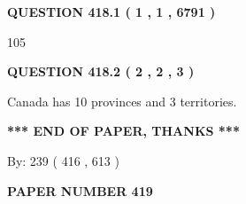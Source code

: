 \documentclass[12pt]{article}
\begin{document}
   
   
   
 \vspace{0.2in}
 
 
 
 
   
   
  
\vspace{0.2in}
  
{\textbf{\Large{QUESTION
418.1 
 ( 1 , 1 , 6791 )
}}}
  
  
 
 
\noindent{}

105
 
 
  
\vspace{0.2in}
  
{\textbf{\Large{QUESTION
418.2 
 ( 2 , 2 , 3 )
}}}
  
  
 
 
\noindent{}
 
 
Canada has 10  provinces and 3 territories.
 
 
 
 
   
   
 \vspace{0.2in}
 
   
   
   
   
\vspace{1.0in} 
{\textbf{\large{ *** END OF PAPER, THANKS *** }}} 
   
   
\hspace{1.0in} By: 
 239 ( 416 ,  613 )
   
   
   
   
\newpage 
\setcounter{page}{ 
   419001 } 
   
   
   
   
 {\textbf{ \Large{ PAPER NUMBER  419  }}}
   
   
\vspace{0.2in}
   
   
   
   
   
   
 \vspace{0.2in}
 
 
 
 
   
\end{document}
